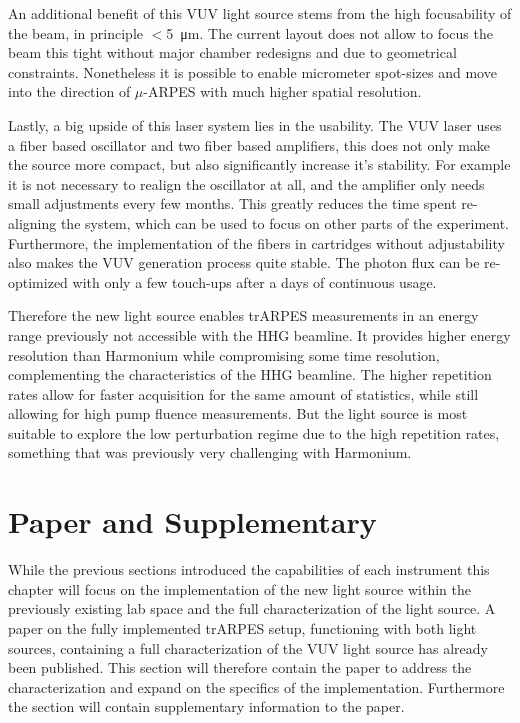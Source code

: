 An additional benefit of this VUV light source stems from the high focusability of the beam, in principle $<$\qty{5}{\micro\meter}.
The current layout does not allow to focus the beam this tight without major chamber redesigns and due to geometrical constraints.
Nonetheless it is possible to enable micrometer spot-sizes and move into the direction of $\mu$-ARPES with much higher spatial resolution.

Lastly, a big upside of this laser system lies in the usability.
The VUV laser uses a fiber based oscillator and two fiber based amplifiers, this does not only make the source more compact, but also significantly increase it's stability.
For example it is not necessary to realign the oscillator at all, and the amplifier only needs small adjustments every few months.
This greatly reduces the time spent re-aligning the system, which can be used to focus on other parts of the experiment.
Furthermore, the implementation of the fibers in cartridges without adjustability also makes the VUV generation process quite stable.
The photon flux can be re-optimized with only a few touch-ups after a days of continuous usage.

Therefore the new light source enables trARPES measurements in an energy range previously not accessible with the HHG beamline.
It provides higher energy resolution than Harmonium while compromising some time resolution, complementing the characteristics of the HHG beamline.
The higher repetition rates allow for faster acquisition for the same amount of statistics, while still allowing for high pump fluence measurements.
But the light source is most suitable to explore the low perturbation regime due to the high repetition rates, something that was previously very challenging with Harmonium.

\section{Paper and Supplementary}

While the previous sections introduced the capabilities of each instrument this chapter will focus on the implementation of the new light source within the previously existing lab space and the full characterization of the light source.
A paper on the fully implemented trARPES setup, functioning with both light sources, containing a full characterization of the VUV light source has already been published.
This section will therefore contain the paper to address the characterization and expand on the specifics of the implementation.
Furthermore the section will contain supplementary information to the paper.

